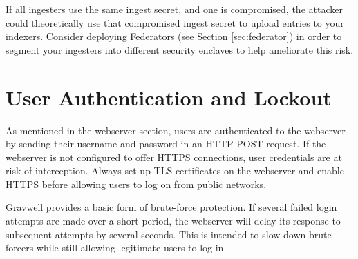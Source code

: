If all ingesters use the same ingest secret, and one is compromised, the attacker
could theoretically use that compromised ingest secret to upload entries to
your indexers. Consider deploying Federators (see Section \ref{sec:federator}) in
order to segment your ingesters into different security enclaves to help ameliorate this risk.

\section{User Authentication and Lockout}

As mentioned in the webserver section, users are authenticated to the
webserver by sending their username and password in an HTTP POST
request. If the webserver is not configured to offer HTTPS connections,
user credentials are at risk of interception. Always set up TLS
certificates on the webserver and enable HTTPS before allowing users to
log on from public networks.

Gravwell provides a basic form of brute-force protection. If several
failed login attempts are made over a short period, the webserver will
delay its response to subsequent attempts by several seconds. This is
intended to slow down brute-forcers while still allowing legitimate
users to log in.
